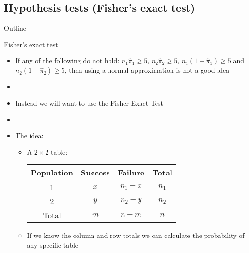 \documentclass[xcolor=dvipsnames]{beamer}
\begin{document}
\subsection{Hypothesis tests (Fisher's exact test)}

\begin{frame}{Outline}
	\tableofcontents[currentsection,subsectionstyle=show/shaded/hide]
\end{frame}

\begin{frame}{Fisher's exact test}
	\begin{itemize}
		\item If any of the following do not hold: $n_1 \hat{\pi}_1 \geq 5$, $n_2 \hat{\pi}_2 \geq 5$, $n_1 (1-\hat{\pi}_1) \geq 5$ and $n_2 (1-\hat{\pi}_2) \geq 5$, then using a normal approximation is not a good idea
		\item[]
		\item Instead we will want to use the Fisher Exact Test
		\item[]
		\item The idea:
		\begin{itemize}
			\item A $2\times 2$ table:
			\begin{center}
				\begin{tabular}{c|cc|c}
					\hline
					\textbf{Population} & \textbf{Success} & \textbf{Failure} & \textbf{Total} \\ \hline \hline
					1 & $x$ &$n_1 -x$ & $n_1$\\
					2 & $y$ &$n_2-y$ & $n_2$ \\ \hline \hline
					Total & $m$ & $n-m$ & $n$ \\ \hline
				\end{tabular}
			\vspace{5mm}
			\end{center}
			\item If we know the column and row totals we can calculate the probability of any specific table
		\end{itemize}
	\end{itemize}
\end{frame}
\end{document}
